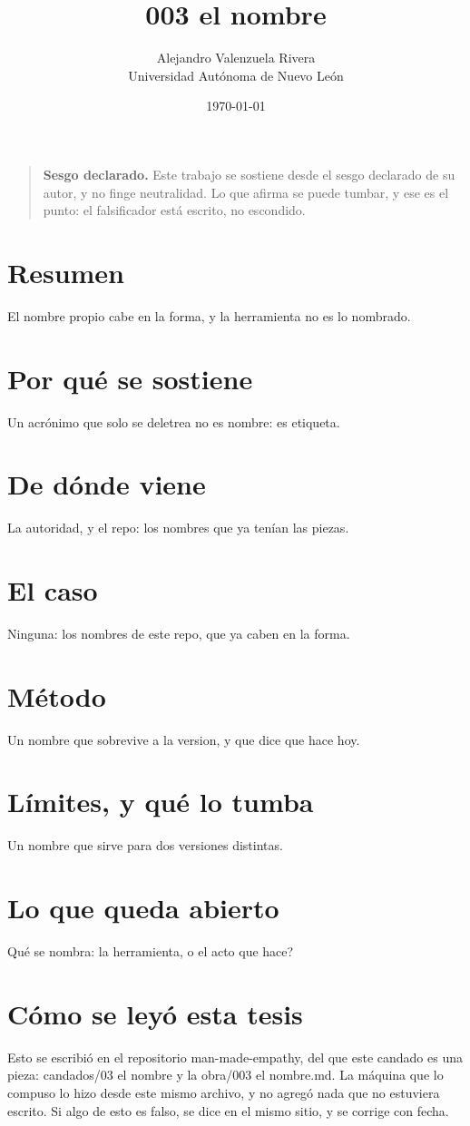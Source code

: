 \documentclass[11pt,a4paper]{article}
\title{003 el nombre}
\author{Alejandro Valenzuela Rivera\\\small Universidad Autónoma de Nuevo León}
\date{\today}
\begin{document}
\maketitle

\begin{quote}
\textbf{Sesgo declarado.} Este trabajo se sostiene desde el sesgo declarado de su autor, y no finge neutralidad. Lo que afirma se puede tumbar, y ese es el punto: el falsificador está escrito, no escondido.
\end{quote}

\section*{Resumen}
El nombre propio cabe en la forma, y la herramienta no es lo nombrado.

\section{Por qué se sostiene}
Un acrónimo que solo se deletrea no es nombre: es etiqueta.

\section{De dónde viene}
La autoridad, y el repo: los nombres que ya tenían las piezas.

\section{El caso}
Ninguna: los nombres de este repo, que ya caben en la forma.

\section{Método}
Un nombre que sobrevive a la version, y que dice que hace hoy.

\section{Límites, y qué lo tumba}
Un nombre que sirve para dos versiones distintas.

\section{Lo que queda abierto}
\textquestiondown{}Qué se nombra: la herramienta, o el acto que hace?

\section*{Cómo se leyó esta tesis}
Esto se escribió en el repositorio man-made-empathy, del que este candado es una pieza: candados/03 el nombre y la obra/003 el nombre.md. La máquina que lo compuso lo hizo desde este mismo archivo, y no agregó nada que no estuviera escrito. Si algo de esto es falso, se dice en el mismo sitio, y se corrige con fecha.
\end{document}
